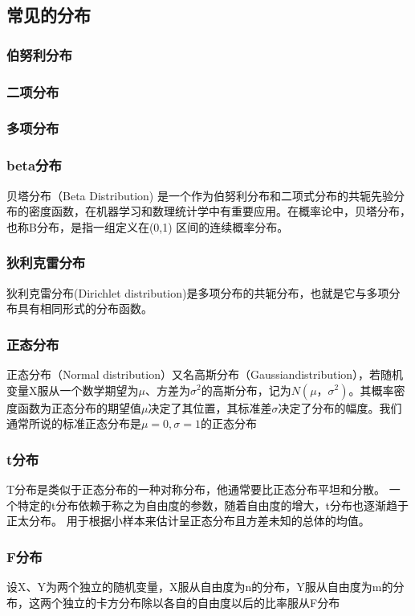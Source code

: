 \documentclass{scrartcl}
\numberwithin{equation}{section}
\begin{document}
\subsection{常见的分布}
\subsubsection{伯努利分布}
\subsubsection{二项分布}
\subsubsection{多项分布}
\subsubsection{beta分布}
贝塔分布（Beta Distribution) 是一个作为伯努利分布和二项式分布的共轭先验分布的密度函数，在机器学习和数理统计学中有重要应用。在概率论中，贝塔分布，也称Β分布，是指一组定义在(0,1) 区间的连续概率分布。

\subsubsection{狄利克雷分布}
狄利克雷分布(Dirichlet distribution)是多项分布的共轭分布，也就是它与多项分布具有相同形式的分布函数。


\subsubsection{正态分布}
正态分布（Normal distribution）又名高斯分布（Gaussiandistribution），若随机变量X服从一个数学期望为$μ$、方差为$σ^2$的高斯分布，记为$N(μ，σ^2)$。其概率密度函数为正态分布的期望值$μ$决定了其位置，其标准差$σ$决定了分布的幅度。我们通常所说的标准正态分布是$μ = 0,σ = 1$的正态分布

\subsubsection{t分布}
T分布是类似于正态分布的一种对称分布，他通常要比正态分布平坦和分散。 一个特定的t分布依赖于称之为自由度的参数，随着自由度的增大，t分布也逐渐趋于正太分布。 用于根据小样本来估计呈正态分布且方差未知的总体的均值。
\subsubsection{F分布}
设X、Y为两个独立的随机变量，X服从自由度为n的分布，Y服从自由度为m的分布，这两个独立的卡方分布除以各自的自由度以后的比率服从F分布
\end{document}
